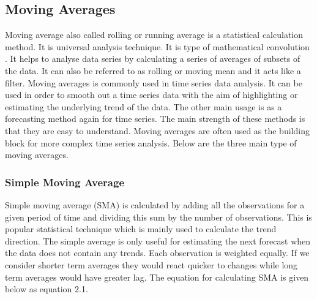 
\subsection{Moving Averages}
Moving average also called rolling or running average is a statistical calculation method. It is universal analysis technique. It is type of mathematical convolution \cite{shumway2010time}. It helps to analyse data series by calculating a series of averages of subsets of the data. It can also be referred to as rolling or moving mean and it acts like a filter. Moving averages is commonly used in time series data analysis. It can be used in order to smooth out  a time series data with the aim of highlighting or estimating the underlying trend of the data. The other main usage is as a forecasting method again for time series. The main strength of these methods is that they are easy to understand.  Moving averages are often used as the building block for more complex time series analysis. Below are the three main type of moving averages.

\subsubsection{Simple Moving Average}
Simple moving average (SMA) is calculated by adding all the observations for a given period of time and dividing this sum by the number of observations. This is popular statistical technique which is mainly used to calculate the trend direction. The simple average is only useful for estimating the next forecast when the data does not contain any trends. Each observation is weighted equally. If we consider shorter term averages they would react quicker to changes while long term averages would have greater lag. The equation for calculating SMA is given below as equation 2.1.\\


